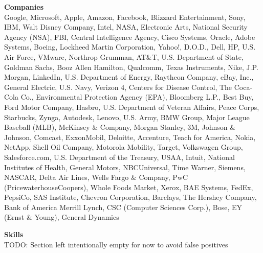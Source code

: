 \documentclass[a4paper,11pt]{article} %
\begin{document}
\textbf{Companies} \\
Google, Microsoft, Apple, Amazon, Facebook, Blizzard Entertainment, Sony, IBM,
Walt Disney Company, Intel, NASA, Electronic Arts, National Security Agency
(NSA), FBI, Central Intelligence Agency, Cisco Systems, Oracle, Adobe Systems,
Boeing, Lockheed Martin Corporation, Yahoo!, D.O.D., Dell, HP, U.S. Air Force,
VMware, Northrop Grumman, AT\&T, U.S. Department of State, Goldman Sachs, Booz
Allen Hamilton, Qualcomm, Texas Instruments, Nike, J.P. Morgan, LinkedIn, U.S.
Department of Energy, Raytheon Company, eBay, Inc., General Electric, U.S. Navy,
Verizon 4, Centers for Disease Control, The Coca-Cola Co., Environmental
Protection Agency (EPA), Bloomberg L.P., Best Buy, Ford Motor Company, Hasbro,
U.S. Department of Veteran Affairs, Peace Corps, Starbucks, Zynga, Autodesk,
Lenovo, U.S. Army, BMW Group, Major League Baseball (MLB), McKinsey \& Company,
Morgan Stanley, 3M, Johnson \& Johnson, Comcast, ExxonMobil, Deloitte, Accenture,
Teach for America, Nokia, NetApp, Shell Oil Company, Motorola Mobility, Target,
Volkswagen Group, Salesforce.com, U.S. Department of the Treasury, USAA, Intuit,
National Institutes of Health, General Motors, NBCUniversal, Time Warner,
Siemens, NASCAR, Delta Air Lines, Wells Fargo \& Company, PwC
(PricewaterhouseCoopers), Whole Foods Market, Xerox, BAE Systems, FedEx,
PepsiCo, SAS Institute, Chevron Corporation, Barclays, The Hershey Company, Bank
of America Merrill Lynch, CSC (Computer Sciences Corp.), Bose, EY (Ernst \&
Young), General Dynamics

\textbf{Skills} \\
TODO: Section left intentionally empty for now to avoid false positives
\end{document}

